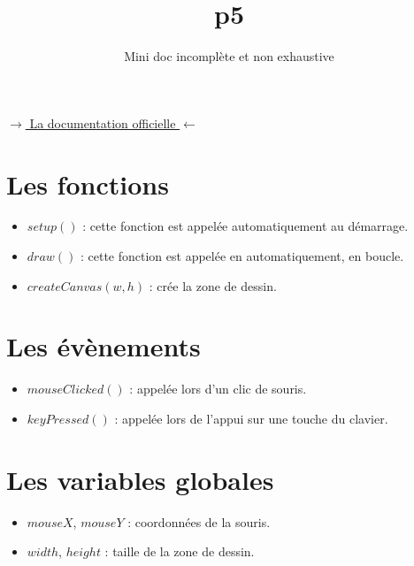 \documentclass{scrartcl}
\title{p5}
\subtitle{Mini doc incomplète et non exhaustive}
\date{}
\begin{document}
	\maketitle{}

	\href{https://p5js.org/reference/}{$\rightarrow$ La documentation officielle $\leftarrow$}
	
	\section*{Les fonctions}
		\begin{itemize}
			\item $setup()$ : cette fonction est appelée automatiquement au démarrage.
			\item $draw()$ : cette fonction est appelée en automatiquement, en boucle.
			\item $createCanvas(w,h)$ : crée la zone de dessin.
		\end{itemize}
	\section*{Les évènements}
		\begin{itemize}
			\item $mouseClicked()$ : appelée lors d'un clic de souris.
			\item $keyPressed()$ : appelée lors de l'appui sur une touche du clavier.
		\end{itemize}
		
	\section*{Les variables globales}
		\begin{itemize}
			\item $mouseX$, $mouseY$ : coordonnées de la souris.
			\item $width$, $height$ : taille de la zone de dessin.
		\end{itemize}
\end{document}
